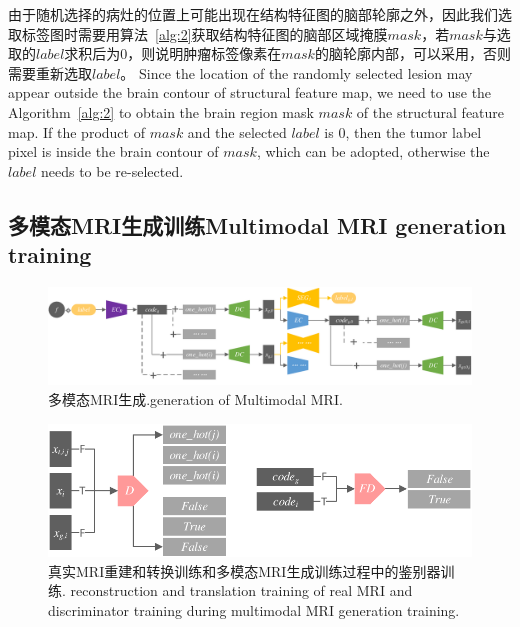 \documentclass[letterpaper]{article} %
\begin{document}
由于随机选择的病灶的位置上可能出现在结构特征图的脑部轮廓之外，因此我们选取标签图时需要用算法~\ref{alg:2}获取结构特征图的脑部区域掩膜$mask$，若$mask$与选取的$label$求积后为0，则说明肿瘤标签像素在$mask$的脑轮廓内部，可以采用，否则需要重新选取$label$。
Since the location of the randomly selected lesion may appear outside the brain contour of structural feature map, we need to use the Algorithm~\ref{alg:2} to obtain the brain region mask $mask$ of the structural feature map. If the product of $mask$ and the selected $label$ is 0, then the tumor label pixel is inside the brain contour of $mask$, which can be adopted, otherwise the $label$ needs to be re-selected.

\subsection{多模态MRI生成训练Multimodal MRI generation training}
\begin{figure}
	\centering
	\includegraphics[width=0.98\columnwidth]{figures/mm_mri_generate}
	\caption{多模态MRI生成.generation of Multimodal MRI.}
	\label{mm_mri_generate}
\end{figure}

\begin{figure}
	\centering
	\includegraphics[width=0.8\columnwidth]{figures/D}
	\caption{真实MRI重建和转换训练和多模态MRI生成训练过程中的鉴别器训练. reconstruction and translation training of real MRI and discriminator training during multimodal MRI generation training.}
	\label{train_D}
\end{figure}
\end{document}
